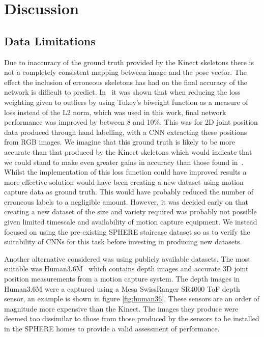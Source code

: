 \documentclass[11pt]{article} %
\begin{document}
\section{Discussion}
\label{sec:discussion}


\subsection{Data Limitations}

Due to inaccuracy of the ground truth provided by the Kinect skeletons there is not a completely consistent mapping between image and the pose vector. The effect the inclusion of erroneous skeletons has had on the final accuracy of the network is difficult to predict. In~\cite{Belagiannis} it was shown that when reducing the loss weighting given to outliers by using Tukey's biweight function as a measure of loss instead of the L2 norm, which was used in this work, final network performance was improved by between 8 and 10\%. This was for 2D joint position data produced through hand labelling, with a CNN extracting these positions from RGB images. We imagine that this ground truth is likely to be more accurate than that produced by the Kinect skeletons which would indicate that we could stand to make even greater gains in accuracy than those found in~\cite{Belagiannis}. Whilst the implementation of this loss function could have improved results a more effective solution would have been creating a new dataset using motion capture data as ground truth. This would have probably reduced the number of erroneous labels to a negligible amount. However, it was decided early on that creating a new dataset of the size and variety required was probably not possible given limited timescale and availability of motion capture equipment. We instead focused on using the pre-existing SPHERE staircase dataset so as to verify the suitability of CNNs for this task before investing in producing new datasets.

Another alternative considered was using publicly available datasets. The most suitable was Human3.6M~\cite{Ionescu2014} which contains depth images and accurate 3D joint position measurements from a motion capture system. The depth images in Human3.6M were a captured using a Mesa SwissRanger SR4000 ToF depth sensor, an example is shown in figure \ref{fig:human36}. These sensors are an order of magnitude more expensive than the Kinect. The images they produce were deemed too dissimilar to those from those produced by the sensors to be installed in the SPHERE homes to provide a valid assessment of performance.
\end{document}
